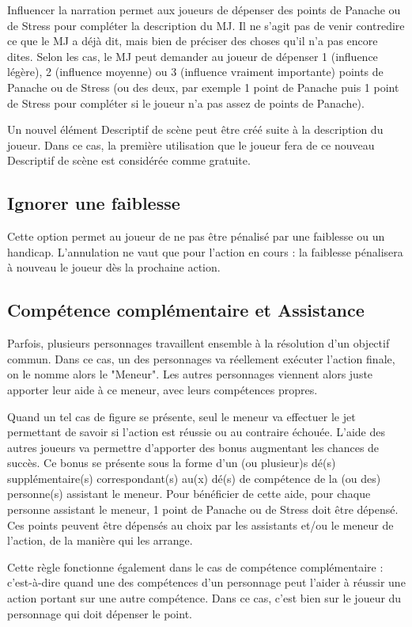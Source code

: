 \begin{multicols}{2}
Influencer la narration permet aux joueurs de dépenser des points de Panache ou de Stress pour compléter la description du MJ. Il ne s'agit pas de venir contredire ce que le MJ a déjà dit, mais bien de préciser des choses qu'il n'a pas encore dites. Selon les cas, le MJ peut demander au joueur de dépenser 1 (influence légère), 2 (influence moyenne) ou 3 (influence vraiment importante) points de Panache ou de Stress (ou des deux, par exemple 1 point de Panache puis 1 point de Stress pour compléter si le joueur n'a pas assez de points de Panache).

Un nouvel élément Descriptif de scène peut être créé suite à la description du joueur. Dans ce cas, la première utilisation que le joueur fera de ce nouveau Descriptif de scène est considérée comme gratuite.



\subsection{Ignorer une faiblesse}

Cette option permet au joueur de ne pas être pénalisé par une faiblesse ou un handicap. L'annulation ne vaut que pour l'action en cours : la faiblesse pénalisera à nouveau le joueur dès la prochaine action.

\subsection{Compétence complémentaire et Assistance}

Parfois, plusieurs personnages travaillent ensemble à la résolution d'un objectif commun. Dans ce cas, un des personnages va réellement exécuter l'action finale, on le nomme alors le "Meneur". Les autres personnages viennent alors juste apporter leur aide à ce meneur, avec leurs compétences propres.

Quand un tel cas de figure se présente, seul le meneur va effectuer le jet permettant de savoir si l'action est réussie ou au contraire échouée. L'aide des autres joueurs va permettre d'apporter des bonus augmentant les chances de succès. Ce bonus se présente sous la forme d'un (ou plusieur)s dé(s) supplémentaire(s) correspondant(s) au(x) dé(s) de compétence de la (ou des) personne(s) assistant le meneur. Pour bénéficier de cette aide, pour chaque personne assistant le meneur, 1 point de Panache ou de Stress doit être dépensé. Ces points peuvent être dépensés au choix par les assistants et/ou le meneur de l'action, de la manière qui les arrange.

Cette règle fonctionne également dans le cas de compétence complémentaire : c'est-à-dire quand une des compétences d'un personnage peut l'aider à réussir une action portant sur une autre compétence. Dans ce cas, c'est bien sur le joueur du personnage qui doit dépenser le point.

\end{multicols}

